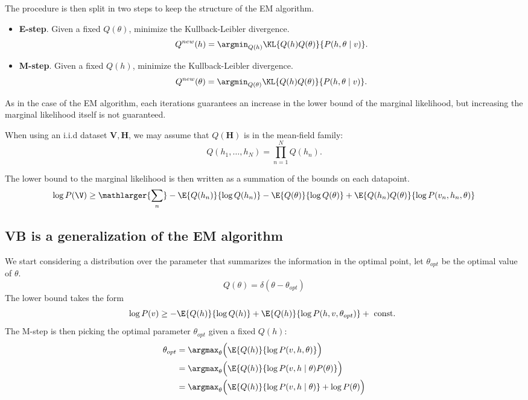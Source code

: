 The procedure is then split in two steps to keep the structure of the EM algorithm.

\begin{itemize}
  \item \textbf{E-step}. Given a fixed \(Q(\theta)\), minimize the Kullback-Leibler divergence.
    \[
    Q^{new}(h) = \argmin_{Q(h)}\KL{Q(h)Q(\theta)}{P(h,\theta \mid v)}.
    \]

  \item \textbf{M-step}. Given a fixed \(Q(h)\), minimize the Kullback-Leibler divergence.
    \[
    Q^{new}(\theta) = \argmin_{Q(\theta)}\KL{Q(h)Q(\theta)}{P(h,\theta \mid v)}.
    \]
\end{itemize}

As in the case of the EM algorithm, each iterations guarantees an increase in the lower bound of the marginal likelihood, but increasing the marginal likelihood itself is not guaranteed.

When using an i.i.d dataset \(\bm{V}, \bm{H}\), we may assume that \(Q(\bm{H})\) is in the mean-field family:
\[
  Q(h_{1}, \dots, h_{N}) = \prod_{n=1}^{N}Q(h_{n}).
\]

The lower bound to the marginal likelihood is then written as a summation of the bounds on each datapoint.
\[
  \log{P(\V)} \geq \mathlarger{\sum_{n}} -\E{Q(h_{n})}{\log{Q(h_{n})}}- \E{Q(\theta)}{\log{Q(\theta)}} + \E{Q(h_{n})Q(\theta)}{\log{P(v_{n}, h_{n},\theta)}}
\]

\subsection{VB is a generalization of the EM algorithm}

We start considering a distribution over the parameter that summarizes the information in the optimal point, let \(\theta_{opt}\) be the optimal value of \(\theta\).
\[
  Q(\theta) = \delta(\theta - \theta_{opt})
\]
The lower bound takes the form
\[
  \log{P(v)} \geq - \E{Q(h)}{\log{Q(h)}} + \E{Q(h)}{\log{P(h, v, \theta_{opt})}} + \text{ const. }
\]
The M-step is then picking the optimal parameter \(\theta_{opt}\) given a fixed \(Q(h)\):
\[
  \begin{aligned}
    \theta_{opt} &= \argmax_{\theta} \Big( \E{Q(h)}{\log{P(v,h,\theta)}} \Big)\\
    &=  \argmax_{\theta} \Big( \E{Q(h)}{\log{P(v, h \mid \theta)P(\theta)}} \Big) \\
    &= \argmax_{\theta} \Big( \E{Q(h)}{\log{P(v,h \mid\theta)}} + \log{P(\theta)} \Big) \\
  \end{aligned}
\]

